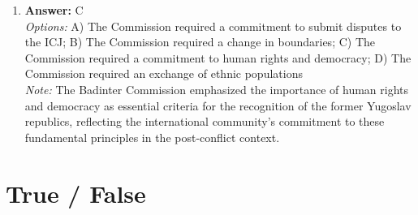 \documentclass[12pt]{article}
\begin{document}
\begin{enumerate}[label=\arabic*.]
\item \textbf{Answer:} C
\\ \textit{Options:} A) The Commission required a commitment to submit disputes to the ICJ; B) The Commission required a change in boundaries; C) The Commission required a commitment to human rights and democracy; D) The Commission required an exchange of ethnic populations
\\ \textit{Note:} The Badinter Commission emphasized the importance of human rights and democracy as essential criteria for the recognition of the former Yugoslav republics, reflecting the international community's commitment to these fundamental principles in the post-conflict context.
\end{enumerate}

\section*{True / False}
\end{document}
